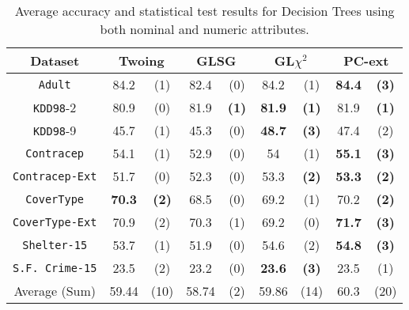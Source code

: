 \begin{table}
\small
\caption{Average accuracy and statistical test results for  Decision Trees using both nominal and numeric attributes.}
\centering
\begin{tabular}{c|cc|cc|cc|cc} 
Dataset            &\multicolumn{2}{c|}{Twoing} & \multicolumn{2}{c|}{GLSG} & \multicolumn{2}{c|}{GL$\chi^2$} & \multicolumn{2}{c}{PC-ext}\\  \hline   
{\tt Adult}        & 84.2           & (1)       & 82.4       & (0)          &  84.2       & (1)               & {\bf 84.4 } & {\bf (3) }  \\
{\tt KDD98}-2      & 80.9           & (0)       & 81.9       & {\bf (1)}    & {\bf 81.9 } & {\bf (1) }        & 81.9        & {\bf (1) }  \\ 
{\tt KDD98}-9      & 45.7           & (1)       & 45.3       &  (0)         & {\bf 48.7 } & {\bf (3) }        &  47.4       & (2)         \\ 
{\tt Contracep}    & 54.1           & (1)       & 52.9       &  (0)         & 54          & (1)               & {\bf 55.1 } & {\bf (3) }  \\ 
{\tt Contracep-Ext}& 51.7           & (0)       & 52.3       &  (0)         & 53.3        & {\bf (2) }        & {\bf 53.3 } & {\bf (2) }  \\ 
{\tt CoverType}    &  {\bf 70.3 }   & {\bf (2)} & 68.5       &  (0)         & 69.2        & (1)               &  70.2       & {\bf (2) }  \\ 
{\tt CoverType-Ext}& 70.9           & (2)       & 70.3       &  (1)         & 69.2        & (0)               & {\bf 71.7 } & {\bf (3) }  \\ 
{\tt Shelter-15}   & 53.7           & (1)       & 51.9       &  (0)         & 54.6        & (2)               & {\bf 54.8 } & {\bf (3) }  \\   
{\tt S.F. Crime-15}& 23.5           & (2)       & 23.2       &  (0)         & {\bf 23.6 } & {\bf (3) }        & 23.5        & (1)         \\ 
\hline
Average (Sum)      & 59.44          & (10)      & 58.74      &  (2)         & 59.86       & (14)              & 60.3        & (20)

\end{tabular}
\label{exp:numeric-5}
\normalsize
\end{table}


